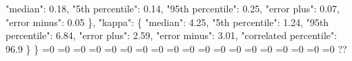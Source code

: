 {{        "median": 0.18, %
        "5th percentile": 0.14, %
        "95th percentile": 0.25, %
        "error plus": 0.07, %
        "error minus": 0.05%
      \}, %
      "kappa": \{%
        "median": 4.25, %
        "5th percentile": 1.24, %
        "95th percentile": 6.84, %
        "error plus": 2.59, %
        "error minus": 3.01, %
        "correlated percentile": 96.9%
      \}%
    \}}%
  \else%
    \ifnum{}=0%
      \let\zchieffCopulaCorrelationModel@I@out\zchieffCopulaCorrelationModel@III%
    \else%
      \ifnum{}=0%
      \let\zchieffCopulaCorrelationModel@I@out\zchieffCopulaCorrelationModel@IV%
    \else%
      \ifnum{}=0%
      \let\zchieffCopulaCorrelationModel@I@out\zchieffCopulaCorrelationModel@V%
    \else%
      \ifnum{}=0%
      \let\zchieffCopulaCorrelationModel@I@out\zchieffCopulaCorrelationModel@VI%
    \else%
      \ifnum{}=0%
      \let\zchieffCopulaCorrelationModel@I@out\zchieffCopulaCorrelationModel@VII%
    \else%
      \ifnum{}=0%
      \let\zchieffCopulaCorrelationModel@I@out\zchieffCopulaCorrelationModel@VIII%
    \else%
      \ifnum{}=0%
      \let\zchieffCopulaCorrelationModel@I@out\zchieffCopulaCorrelationModel@IX%
    \else%
      \ifnum{}=0%
      \let\zchieffCopulaCorrelationModel@I@out\zchieffCopulaCorrelationModel@X%
    \else%
      \ifnum{}=0%
      \let\zchieffCopulaCorrelationModel@I@out\zchieffCopulaCorrelationModel@XI%
    \else%
      \ifnum{}=0%
      \let\zchieffCopulaCorrelationModel@I@out\zchieffCopulaCorrelationModel@XII%
    \else%
      \ifnum{}=0%
      \let\zchieffCopulaCorrelationModel@I@out\zchieffCopulaCorrelationModel@XIII%
    \else%
      \ifnum{}=0%
      \let\zchieffCopulaCorrelationModel@I@out\zchieffCopulaCorrelationModel@XIV%
    \else%
      \ifnum{}=0%
      \let\zchieffCopulaCorrelationModel@I@out\zchieffCopulaCorrelationModel@XV%
    \else%
      \ifnum{}=0%
      \let\zchieffCopulaCorrelationModel@I@out\zchieffCopulaCorrelationModel@XVI%
    \else%
      \ifnum{}=0%
      \let\zchieffCopulaCorrelationModel@I@out\zchieffCopulaCorrelationModel@XVII%
    \else%
      \ifnum{}=0%
      \let\zchieffCopulaCorrelationModel@I@out\zchieffCopulaCorrelationModel@XVIII%
    \else%
      \ifnum{}=0%
      \let\zchieffCopulaCorrelationModel@I@out\zchieffCopulaCorrelationModel@XIX%
    \else%
      \ifnum{}=0%
      \let\zchieffCopulaCorrelationModel@I@out\zchieffCopulaCorrelationModel@XX%
    \else%
      \ifnum{}=0%
      \let\zchieffCopulaCorrelationModel@I@out\zchieffCopulaCorrelationModel@XXI%
    \else%
      \def\zchieffCopulaCorrelationModel@I@out{%
    ??}%
    \fi\fi\fi\fi\fi\fi\fi\fi\fi\fi\fi\fi\fi\fi\fi\fi\fi\fi\fi
  \fi
  \zchieffCopulaCorrelationModel@I@out
}\newcommand\zchieffCopulaCorrelationModel@II[1][all]{%
  \ifnum\pdfstrcmp{#1}{all}=0%
    \def\zchieffCopulaCorrelationModel@II@out{%
    \{\}}%
  \else%
    \def\zchieffCopulaCorrelationModel@II@out{%
    ??}%
    
}

